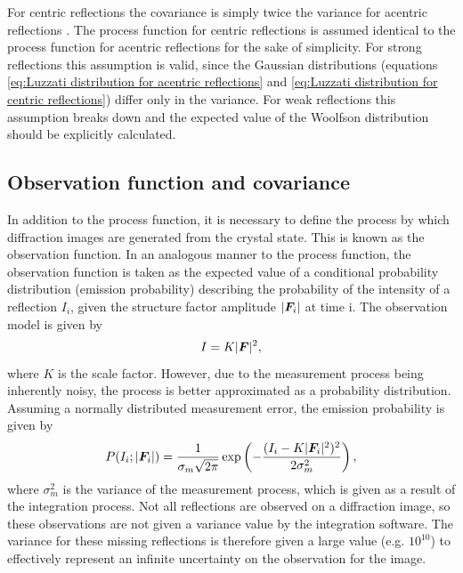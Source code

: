 For centric reflections the covariance is simply twice the variance for acentric reflections \cite{terwilliger1996bayesian}.
The process function for centric reflections is assumed identical to the process function for acentric reflections for the sake of simplicity.
For strong reflections this assumption is valid, since the Gaussian distributions (equations \ref{eq:Luzzati distribution for acentric reflections} and \ref{eq:Luzzati distribution for centric reflections}) differ only in the variance.
For weak reflections this assumption breaks down and the expected value of the Woolfson distribution should be explicitly calculated.

\subsection{Observation function and covariance}
\label{sub:Observation Function and covariance}
In addition to the process function, it is necessary to define the process by which diffraction images are generated from the crystal state.
This is known as the observation function.
In an analogous manner to the process function, the observation function is taken as the expected value of a conditional probability distribution (emission probability) describing the probability of the intensity of a reflection $I_i$, given the structure factor amplitude $|\boldsymbol{F}_i|$ at time i.
The observation model is given by \cite{otwinowski2003multiparametric}
\begin{equation}
    I = K |\boldsymbol{F}|^2,
    \label{eq:Observation Model}
\end{equation}
where $K$ is the scale factor.
However, due to the measurement process being inherently noisy, the process is better approximated as a probability distribution.
Assuming a normally distributed measurement error, the emission probability is given by
\begin{equation}
    P(I_i ; |\boldsymbol{F}_i|) = \frac{1}{\sigma_m \sqrt{2 \pi}} \exp \left(-\frac{(I_i - K|\boldsymbol{F}_i|^2)^2}{2 \sigma_m^2}\right),
\end{equation}
where $\sigma_m^2$ is the variance of the measurement process, which is given as a result of the integration process.
Not all reflections are observed on a diffraction image, so these observations are not given a variance value by the integration software.
The variance for these missing reflections is therefore given a large value (e.g. $10^{10}$) to effectively represent an infinite uncertainty on the observation for the image.

